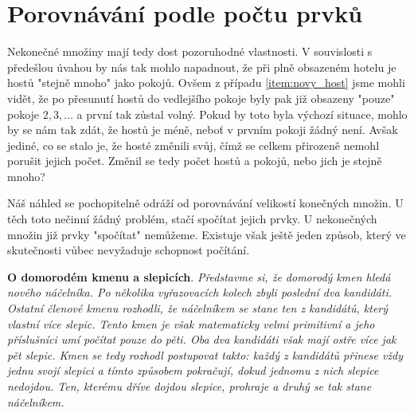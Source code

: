 \section{Porovnávání podle počtu prvků}\label{sec:porovnavani_podle_poctu_prvku}
Nekonečné množiny mají tedy dost pozoruhodné vlastnosti. V souvislosti s předešlou úvahou by nás tak mohlo napadnout, že při plně obsazeném hotelu je hostů "stejně mnoho" jako pokojů. Ovšem z případu \ref{item:novy_host} jsme mohli vidět, že po přesunutí hostů do vedlejšího pokoje byly pak již obsazeny "pouze" pokoje $2,3,\dots$ a první tak zůstal volný. Pokud by toto byla výchozí situace, mohlo by se nám tak zdát, že hostů je méně, neboť v prvním pokoji žádný není. Avšak jediné, co se stalo je, že hosté změnili svůj, čímž se celkem přirozeně nemohl porušit jejich počet. Změnil se tedy počet hostů a pokojů, nebo jich je stejně mnoho?\par
Náš náhled se pochopitelně odráží od porovnávání velikostí konečných množin. U těch toto nečinní žádný problém, stačí spočítat jejich prvky. U nekonečných množin již prvky "spočítat" nemůžeme. Existuje však ještě jeden způsob, který ve skutečnosti vůbec nevyžaduje schopnost počítání.
\medskip

\noindent\textbf{O domorodém kmenu a slepicích}. \textit{Představme si, že domorodý kmen hledá nového náčelníka. Po několika vyřazovacích kolech zbyli poslední dva kandidáti. Ostatní členové kmenu rozhodli, že náčelníkem se stane ten z kandidátů, který vlastní více slepic. Tento kmen je však matematicky velmi primitivní a jeho příslušníci umí počítat pouze do pěti. Oba dva kandidáti však mají ostře více jak pět slepic. Kmen se tedy rozhodl postupovat takto: každý z kandidátů přinese vždy jednu svojí slepici a tímto způsobem pokračují, dokud jednomu z nich slepice nedojdou. Ten, kterému dříve dojdou slepice, prohraje a druhý se tak stane náčelníkem.}
\medskip

